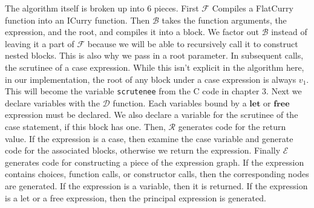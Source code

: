 \documentclass{book}
\theoremstyle{definition}
\newcommand{\Varid}[1]{\mathit{#1}}
\begin{document}
The algorithm itself is broken up into 6 pieces.
First \ensuremath{\mathcal{F} } Compiles a FlatCurry function into an ICurry function.
Then \ensuremath{\mathcal{B} } takes the function arguments, the expression, and the root,
and compiles it into a block.
We factor out \ensuremath{\mathcal{B} } instead of leaving it a part of \ensuremath{\mathcal{F} }
because we will be able to recursively call it to construct nested blocks.
This is also why we pass in a root parameter.
In subsequent calls, the scrutinee of a case expression.
While this isn't explicit in the algorithm here,
in our implementation, the root of any block under a case expression
is always \ensuremath{\Varid{v}_{\mathrm{1}}}.
This will become the variable \texttt{scrutenee} from the C code in chapter 3.
Next we declare variables with the \ensuremath{\mathcal{D} } function.
Each variables bound by a \ensuremath{\mathbf{let}} or \ensuremath{\textbf{free} } expression must be declared.
We also declare a variable for the scrutinee of the case statement, if this block has one.
Then, \ensuremath{\mathcal{R} } generates code for the return value.
If the expression is a case, 
then examine the case variable and generate code for the associated blocks,
otherwise we return the expression.
Finally \ensuremath{\mathcal{E} } generates code for constructing a piece of the expression graph.
If the expression contains choices, function calls, or constructor calls, then
the corresponding nodes are generated.
If the expression is a variable, then it is returned.
If the expression is a let or a free expression, then the principal expression is generated.
\end{document}
